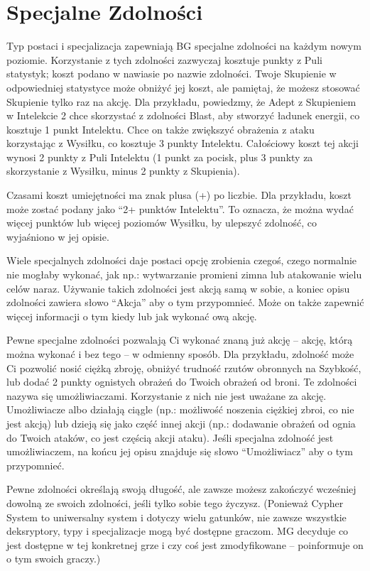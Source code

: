 \section{Specjalne Zdolności}

Typ postaci i specjalizacja zapewniają BG specjalne zdolności na każdym nowym poziomie. Korzystanie z tych zdolności zazwyczaj kosztuje punkty z Puli statystyk; koszt podano w nawiasie po nazwie zdolności. Twoje Skupienie w odpowiedniej statystyce może obniżyć jej koszt, ale pamiętaj, że możesz stosować Skupienie tylko raz na akcję. Dla przykładu, powiedzmy, że Adept z Skupieniem w Intelekcie 2 chce skorzystać z zdolności Blast, aby stworzyć ładunek energii, co kosztuje 1 punkt Intelektu. Chce on także zwiększyć obrażenia z ataku korzystając z Wysiłku, co kosztuje 3 punkty Intelektu. Całościowy koszt tej akcji wynosi 2 punkty z Puli Intelektu (1 punkt za pocisk, plus 3 punkty za skorzystanie z Wysiłku, minus 2 punkty z Skupienia).

Czasami koszt umiejętności ma znak plusa (+) po liczbie. Dla przykładu, koszt może zostać podany jako “2+ punktów Intelektu”. To oznacza, że można wydać więcej punktów lub więcej poziomów Wysiłku, by ulepszyć zdolność, co wyjaśniono w jej opisie.

Wiele specjalnych zdolności daje postaci opcję zrobienia czegoś, czego normalnie nie mogłaby wykonać, jak np.: wytwarzanie promieni zimna lub atakowanie wielu celów naraz. Używanie takich zdolności jest akcją samą w sobie, a koniec opisu zdolności zawiera słowo “Akcja” aby o tym przypomnieć. Może on także zapewnić więcej informacji o tym kiedy lub jak wykonać ową akcję. 

Pewne specjalne zdolności pozwalają Ci wykonać znaną już akcję – akcję, którą można wykonać i bez tego – w odmienny sposób. Dla przykładu, zdolność może Ci pozwolić nosić ciężką zbroję, obniżyć trudność rzutów obronnych na Szybkość, lub dodać 2 punkty ognistych obrażeń do Twoich obrażeń od broni. Te zdolności nazywa się umożliwiaczami. Korzystanie z nich nie jest uważane za akcję. Umożliwiacze albo działają ciągle (np.: możliwość noszenia ciężkiej zbroi, co nie jest akcją) lub dzieją się jako część innej akcji (np.: dodawanie obrażeń od ognia do Twoich ataków, co jest częścią akcji ataku). Jeśli specjalna zdolność jest umożliwiaczem, na końcu jej opisu znajduje się słowo “Umożliwiacz” aby o tym przypomnieć.

Pewne zdolności określają swoją długość, ale zawsze możesz zakończyć wcześniej dowolną ze swoich zdolności, jeśli tylko sobie tego życzysz.
(Ponieważ Cypher System to uniwersalny system i dotyczy wielu gatunków, nie zawsze wszystkie deksryptory, typy i specjalizacje mogą być dostępne graczom. MG decyduje co jest dostępne w tej konkretnej grze i czy coś jest zmodyfikowane – poinformuje on o tym swoich graczy.)


